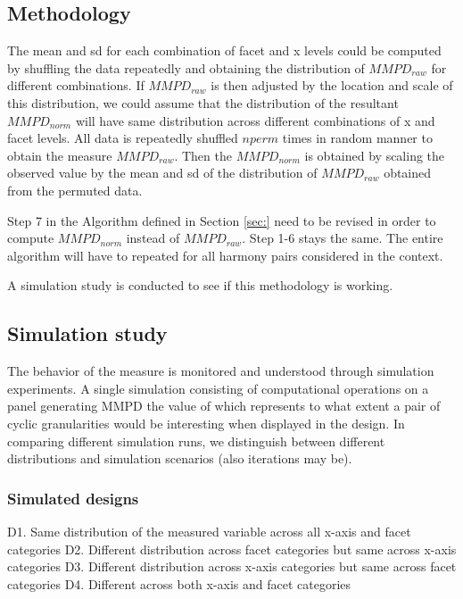 \documentclass[
]{article}
\begin{document}
\hypertarget{methodology}{%
\subsection{Methodology}\label{methodology}}

The mean and sd for each combination of facet and x levels could be computed by shuffling the data repeatedly and obtaining the distribution of \(MMPD_{raw}\) for different combinations. If \(MMPD_{raw}\) is then adjusted by the location and scale of this distribution, we could assume that the distribution of the resultant \(MMPD_{norm}\) will have same distribution across different combinations of x and facet levels. All data is repeatedly shuffled \(nperm\) times in random manner to obtain the measure \(MMPD_{raw}\). Then the \(MMPD_{norm}\) is obtained by scaling the observed value by the mean and sd of the distribution of \(MMPD_{raw}\) obtained from the permuted data.

\noindent Step 7 in the Algorithm defined in Section \ref{sec:} need to be revised in order to compute \(MMPD_{norm}\) instead of \(MMPD_{raw}\). Step 1-6 stays the same. The entire algorithm will have to repeated for all harmony pairs considered in the context.

A simulation study is conducted to see if this methodology is working.

\hypertarget{simulation-study-1}{%
\subsection{Simulation study}\label{simulation-study-1}}

The behavior of the measure is monitored and understood through simulation experiments. A single simulation consisting of computational operations on a panel generating MMPD the value of which represents to what extent a pair of cyclic granularities would be interesting when displayed in the design. In comparing different simulation runs, we distinguish between different distributions and simulation scenarios (also iterations may be).

\hypertarget{simulated-designs}{%
\subsubsection{Simulated designs}\label{simulated-designs}}

D1. Same distribution of the measured variable across all x-axis and facet categories
D2. Different distribution across facet categories but same across x-axis categories
D3. Different distribution across x-axis categories but same across facet categories
D4. Different across both x-axis and facet categories
\end{document}
